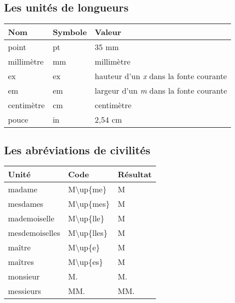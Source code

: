 \documentclass[a4paper,10pt]{article}
\begin{document}
\subsection{Les unités de longueurs}%
\label{sub:unites_longueurs}

\begin{center}%
\begin{tabular}{|l|l|l|}%
\hline%
\rowcolor{grisclair} \textbf{Nom} & \textbf{Symbole} & \textbf{Valeur} \\%
\hline%
point &  pt & 35 mm \\%
\hline%
millimètre &  mm & millimètre \\%
\hline%
ex &  ex & hauteur d'un \emph{x} dans la fonte courante \\%
\hline%
em &  em & largeur d'un \emph{m} dans la fonte courante \\%
\hline%
centimètre & cm & centimètre \\%
\hline%
pouce & in & 2,54 cm \\%
\hline%
\end{tabular}%
\end{center}%


\subsection{Les abréviations de civilités}%
\label{sub:abreviations_civilites}

\begin{center}%
\begin{tabular}{|l|l|l|}%
\hline%
\rowcolor{grisclair} \textbf{Unité} & \textbf{Code} & \textbf{Résultat} \\%
\hline%
madame & M\textbackslash up\{me\} & M\up{me}\\%
\hline%
mesdames & M\textbackslash up\{mes\} & M\up{mes}\\%
\hline%
mademoiselle & M\textbackslash up\{lle\} & M\up{lle}\\%
\hline%
mesdemoiselles & M\textbackslash up\{lles\} & M\up{lles}\\%
\hline%
maître & M\textbackslash up\{e\} & M\up{e}\\%
\hline%
maîtres & M\textbackslash up\{es\} & M\up{es}\\%
\hline%
monsieur & M. & M.\\%
\hline%
messieurs & MM. & MM.\\%
\hline%
\end{tabular}%
\end{center}%
\end{document}
